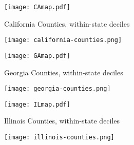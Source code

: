 \documentclass[10pt]{article}
\begin{document}
\maketitle

\begin{figure} 
  \begin{center}
  \caption{California Counties, within-state deciles}
    \texttt{[image: CAmap.pdf]}
  \end{center}
\end{figure}

\begin{figure} 
  \begin{center}
    \texttt{[image: california-counties.png]}
  \end{center}
\end{figure}

\begin{landscape}

\end{landscape}

\begin{figure} 
  \begin{center}
    \caption{Georgia Counties, within-state deciles}
    \texttt{[image: GAmap.pdf]}
  \end{center}
\end{figure}

\begin{figure} 
  \begin{center}
    \texttt{[image: georgia-counties.png]}
  \end{center}
\end{figure}

\begin{landscape}

\end{landscape}

\begin{figure} 
  \begin{center}
    \caption{Illinois Counties, within-state deciles}
    \texttt{[image: ILmap.pdf]}
  \end{center}
\end{figure}

\begin{figure} 
  \begin{center}
    \texttt{[image: illinois-counties.png]}
  \end{center}
\end{figure}

\begin{landscape}

\end{landscape}
\end{document}
